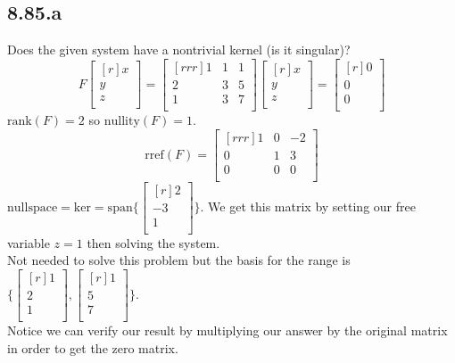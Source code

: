 \documentclass{report}
\theoremstyle{plain}
\theoremstyle{definition}
\theoremstyle{plain}
\begin{document}
\subsection{8.85.a}
Does the given system have a nontrivial kernel (is it singular)?
\[ F\begin{bmatrix}[r]x\\y\\z\\\end{bmatrix} = \begin{bmatrix}[rrr]1&1&1\\2&3&5\\1&3&7\\\end{bmatrix}\begin{bmatrix}[r]x\\y\\z\\\end{bmatrix} = \begin{bmatrix}[r]0\\0\\0\\\end{bmatrix} \]
$\mathrm{rank}(F)=2$ so $\mathrm{nullity}(F)=1$.
\[ \mathrm{rref}(F)=\begin{bmatrix}[rrr]1&0&-2\\0&1&3\\0&0&0\\\end{bmatrix} \]
$\mathrm{nullspace}=\mathrm{ker}=\mathrm{span}\{\begin{bmatrix}[r]2\\-3\\1\\\end{bmatrix}\}$. We get this matrix by setting our free variable $z=1$ then solving the system.\\
Not needed to solve this problem but the basis for the range is $\{\begin{bmatrix}[r]1\\2\\1\\\end{bmatrix},\begin{bmatrix}[r]1\\5\\7\\\end{bmatrix}\}$.\\
Notice we can verify our result by multiplying our answer by the original matrix in order to get the zero matrix.
\end{document}
